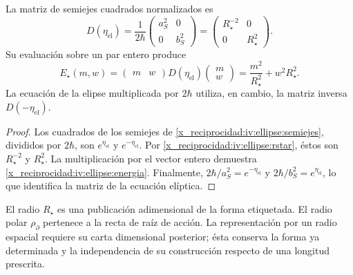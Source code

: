 \begin{proposition}
\label{x_reciprocidad:iv:ellipse:matriz-prop}
La matriz de semiejes cuadrados normalizados es
\begin{equation}
 D(\eta_{\mathrm{el}})
 =\frac1{2\hbar}
    \begin{pmatrix}a_S^2&0\\0&b_S^2\end{pmatrix}
 =\begin{pmatrix}R_\star^{-2}&0\\0&R_\star^2\end{pmatrix}.
 \label{x_reciprocidad:iv:ellipse:matriz}
\end{equation}
Su evaluación sobre un par entero produce
\begin{equation}
 E_\star(m,w)=
 \begin{pmatrix}m&w\end{pmatrix}
 D(\eta_{\mathrm{el}})
 \begin{pmatrix}m\\w\end{pmatrix}
 =\frac{m^2}{R_\star^2}+w^2R_\star^2.
 \label{x_reciprocidad:iv:ellipse:energia}
\end{equation}
La ecuación de la elipse multiplicada por \(2\hbar\)
utiliza, en cambio, la matriz inversa \(D(-\eta_{\mathrm{el}})\).
\end{proposition}
\begin{proof}
Los cuadrados de los semiejes de
\eqref{x_reciprocidad:iv:ellipse:semiejes}, divididos por \(2\hbar\),
son \(e^{\eta_{\mathrm{el}}}\) y
\(e^{-\eta_{\mathrm{el}}}\).
Por \eqref{x_reciprocidad:iv:ellipse:rstar}, éstos son
\(R_\star^{-2}\) y \(R_\star^2\).
La multiplicación por el vector entero demuestra
\eqref{x_reciprocidad:iv:ellipse:energia}. Finalmente,
\(2\hbar/a_S^2=e^{-\eta_{\mathrm{el}}}\) y
\(2\hbar/b_S^2=e^{\eta_{\mathrm{el}}}\), lo que
identifica la matriz de la ecuación elíptica.
\end{proof}

El radio \(R_\star\) es una publicación adimensional de
la forma etiquetada. El radio polar
\(\rho_{\partial}\) pertenece a la recta de raíz de acción.
La representación por un radio espacial requiere su carta
dimensional posterior; ésta conserva la forma ya determinada
y la independencia de su construcción respecto de una
longitud prescrita.
